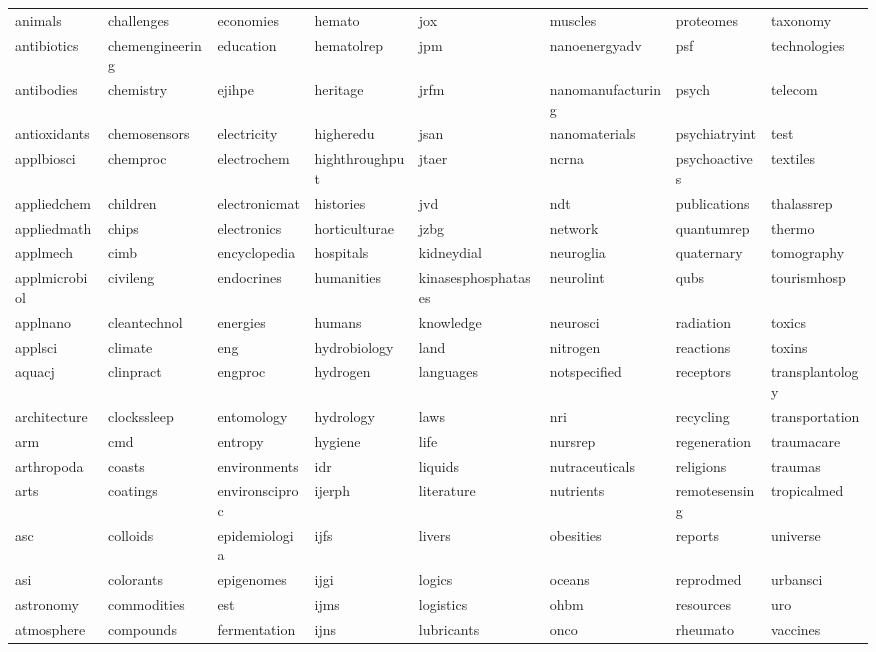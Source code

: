 \documentclass[
]{article}
\begin{document}
\begin{longtable}[t]{llllllll}
animals & challenges & economies & hemato & jox & muscles & proteomes & taxonomy\\
\addlinespace
antibiotics & chemengineering & education & hematolrep & jpm & nanoenergyadv & psf & technologies\\
antibodies & chemistry & ejihpe & heritage & jrfm & nanomanufacturing & psych & telecom\\
antioxidants & chemosensors & electricity & higheredu & jsan & nanomaterials & psychiatryint & test\\
applbiosci & chemproc & electrochem & highthroughput & jtaer & ncrna & psychoactives & textiles\\
appliedchem & children & electronicmat & histories & jvd & ndt & publications & thalassrep\\
\addlinespace
appliedmath & chips & electronics & horticulturae & jzbg & network & quantumrep & thermo\\
applmech & cimb & encyclopedia & hospitals & kidneydial & neuroglia & quaternary & tomography\\
applmicrobiol & civileng & endocrines & humanities & kinasesphosphatases & neurolint & qubs & tourismhosp\\
applnano & cleantechnol & energies & humans & knowledge & neurosci & radiation & toxics\\
applsci & climate & eng & hydrobiology & land & nitrogen & reactions & toxins\\
\addlinespace
aquacj & clinpract & engproc & hydrogen & languages & notspecified & receptors & transplantology\\
architecture & clockssleep & entomology & hydrology & laws & nri & recycling & transportation\\
arm & cmd & entropy & hygiene & life & nursrep & regeneration & traumacare\\
arthropoda & coasts & environments & idr & liquids & nutraceuticals & religions & traumas\\
arts & coatings & environsciproc & ijerph & literature & nutrients & remotesensing & tropicalmed\\
\addlinespace
asc & colloids & epidemiologia & ijfs & livers & obesities & reports & universe\\
asi & colorants & epigenomes & ijgi & logics & oceans & reprodmed & urbansci\\
astronomy & commodities & est & ijms & logistics & ohbm & resources & uro\\
atmosphere & compounds & fermentation & ijns & lubricants & onco & rheumato & vaccines\\

\end{longtable}
\end{document}
